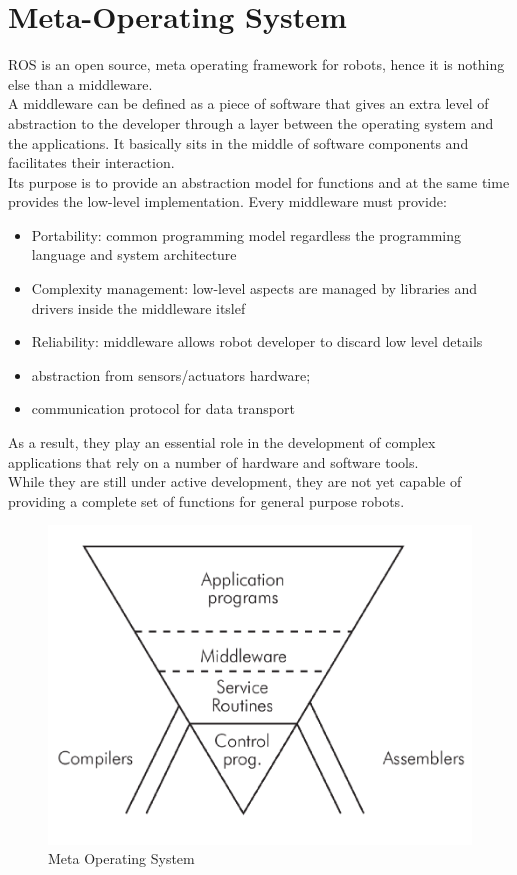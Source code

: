 \section{Meta-Operating System}
ROS is an open source, meta operating framework for robots, hence it is nothing else than a middleware. \\
A middleware can be defined as a piece of software that gives an extra level of abstraction to the developer through a layer between the operating system and the applications.
It basically sits in the middle of software components and facilitates their interaction. \\
Its purpose is to provide an abstraction model for functions and at the same time provides the low-level implementation.
Every middleware must provide:
\begin{itemize}
    \item Portability: common programming model regardless the programming language and system architecture
    \item Complexity management: low-level aspects are managed by libraries and drivers inside the middleware itslef
    \item Reliability: middleware allows robot developer to discard low level details
    \item abstraction from sensors/actuators hardware;
    \item communication protocol for data transport
\end{itemize}
 As a result, they play an essential role in the development of complex applications that rely on a number of hardware and software tools.\\
 While they are still under active development, they are not yet capable of providing a complete set of functions for general purpose robots.
 
\begin{figure}[H]
    \centering
    \includegraphics[scale=0.5]{Images/Chapter 2/middleware.png}
    \caption{Meta Operating System}
    \label{fig:metaoperating}
\end{figure}
 
